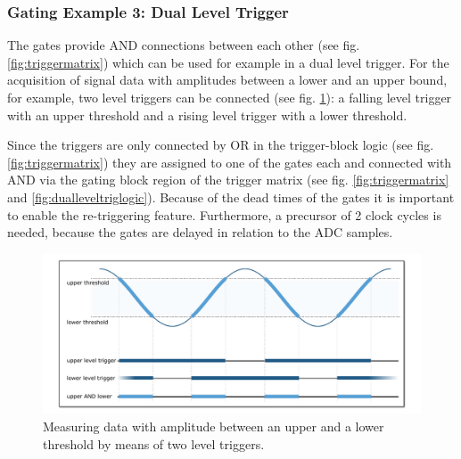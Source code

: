         \subsubsection{Gating Example 3: Dual Level Trigger}

            The gates provide AND connections between each other (see fig. \ref{fig:triggermatrix}) which can be used for example in a dual level trigger. For the acquisition of signal data with amplitudes between a lower and an upper bound, for example, two level triggers can be connected (see fig. \ref{fig:dualleveltrig}): a falling level trigger with an upper threshold and a rising level trigger with a lower threshold.\par
            Since the triggers are only connected by OR in the trigger-block logic (see fig. \ref{fig:triggermatrix}) they are assigned to one of the gates each and connected with AND via the gating block region of the trigger matrix (see fig. \ref{fig:triggermatrix} and \ref{fig:dualleveltriglogic}). Because of the dead times of the gates it is important to enable the re-triggering feature. Furthermore, a precursor of 2 clock cycles is needed, because the gates are delayed in relation to the ADC samples.\par
            \begin{figure}[ht]
                \begin{center}
                    \includegraphics[width=\textwidth]{figures/dual_level_triggering.pdf}
                    \caption{\label{fig:dualleveltrig}Measuring data with amplitude between an upper and a lower threshold by means of two level triggers.}
                \end{center}
            \end{figure}

